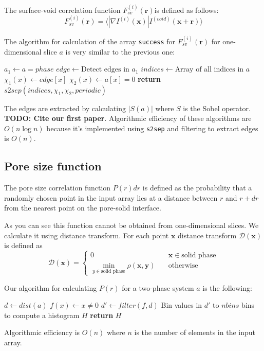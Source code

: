 \documentclass[reprint,amsmath,amssymb,aps,pre]{revtex4-1}
\newcommand{\code}[1]{\colorbox{light-gray}{\texttt{#1}}}
\begin{document}
The surface-void correlation function $F_{sv}^{(i)}(\bm{r})$is defined as
follows:
\begin{equation*}
  F_{sv}^{(i)}(\bm{r}) = \langle |\nabla I^{(i)}(\bm{x})| I^{(void)}(\bm{x}
  + \bm{r}) \rangle
\end{equation*}

The algorithm for calculation of the array \code{success} for
$F_{sv}^{(i)}(\bm{r})$ for one-dimensional slice $a$ is very similar to the
previous one:
\begin{algorithmic}[1]
    \State $a_1 \gets a = phase$
    \State $edge \gets \text{Detect edges in $a_1$}$
    \State $indices \gets \text{Array of all indices in $a$}$
    \State $\chi_1(x) \gets edge[x]$
    \State $\chi_2(x) \gets a[x] = 0$ 
    \State \textbf{return} $s2sep(indices, \chi_1, \chi_2, periodic)$
  \EndProcedure
\end{algorithmic}

The edges are extracted by calculating $|S(a)|$ where $S$ is the Sobel
operator. \textbf{TODO: Cite our first paper}. Algorithmic efficiency of these
algorithms are $O(n\log n)$ because it's implemented using \code{s2sep} and
filtering to extract edges is $O(n)$.

\subsection{Pore size function}
The pore size correlation function $P(r)dr$ is defined as the probability that a
randomly chosen point in the input array lies at a distance between
$r$ and $r + dr$ from the nearest point on the pore-solid interface.

As you can see this function cannot be obtained from one-dimensional slices. We
calculate it using distance transform. For each point $\bm{x}$ distance
transform $\mathcal{D}(\bm{x})$ is defined as
\begin{equation*}
  \mathcal{D}(\bm{x})= \left\{
  \begin{array}{ll}
    0 & \quad \bm{x} \in \text{solid phase} \\
    \min\limits_{y \in \text{solid phase}} \rho(\bm{x},\bm{y}) & \quad \text{otherwise}
  \end{array}
\right.
\end{equation*}

Our algorithm for calculating $P(r)$ for a two-phase system $a$ is the
following:
\begin{algorithmic}[1]
    \State $d \gets dist(a)$ 
    \State $f(x) \gets x \ne 0$
    \State $d' \gets filter(f, d)$
    \State Bin values in $d'$ to $nbins$ bins to compute a histogram $H$
    \State \textbf{return} $H$
  \EndProcedure
\end{algorithmic}
Algorithmic efficiency is $O(n)$ where $n$ is the number of elements in the
input array.
\end{document}

